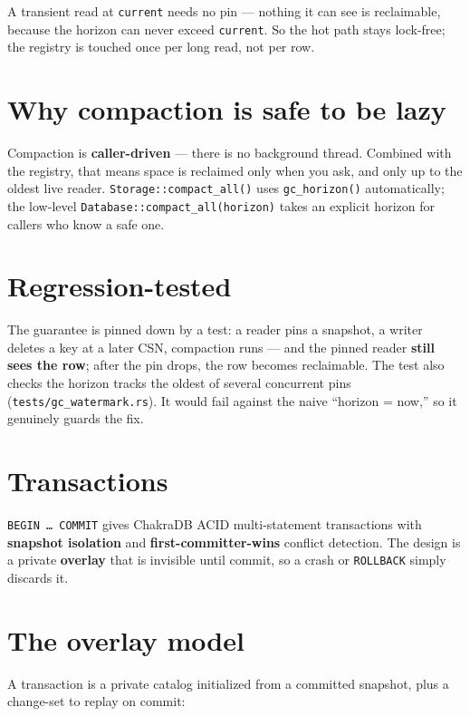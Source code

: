 \documentclass[
  11pt,
  openany]{book}
\begin{document}
A transient read at \texttt{current} needs no pin --- nothing it can see
is reclaimable, because the horizon can never exceed \texttt{current}.
So the hot path stays lock-free; the registry is touched once per long
read, not per row.

\section{Why compaction is safe to be
lazy}\label{why-compaction-is-safe-to-be-lazy}

Compaction is \textbf{caller-driven} --- there is no background thread.
Combined with the registry, that means space is reclaimed only when you
ask, and only up to the oldest live reader.
\texttt{Storage::compact\_all()} uses \texttt{gc\_horizon()}
automatically; the low-level \texttt{Database::compact\_all(horizon)}
takes an explicit horizon for callers who know a safe one.

\section{Regression-tested}\label{regression-tested}

The guarantee is pinned down by a test: a reader pins a snapshot, a
writer deletes a key at a later CSN, compaction runs --- and the pinned
reader \textbf{still sees the row}; after the pin drops, the row becomes
reclaimable. The test also checks the horizon tracks the oldest of
several concurrent pins (\texttt{tests/gc\_watermark.rs}). It would fail
against the naive ``horizon = now,'' so it genuinely guards the fix.

\section{Transactions}\label{transactions}

\texttt{BEGIN\ …\ COMMIT} gives ChakraDB ACID multi-statement
transactions with \textbf{snapshot isolation} and
\textbf{first-committer-wins} conflict detection. The design is a
private \textbf{overlay} that is invisible until commit, so a crash or
\texttt{ROLLBACK} simply discards it.

\section{The overlay model}\label{the-overlay-model}

A transaction is a private catalog initialized from a committed
snapshot, plus a change-set to replay on commit:
\end{document}
